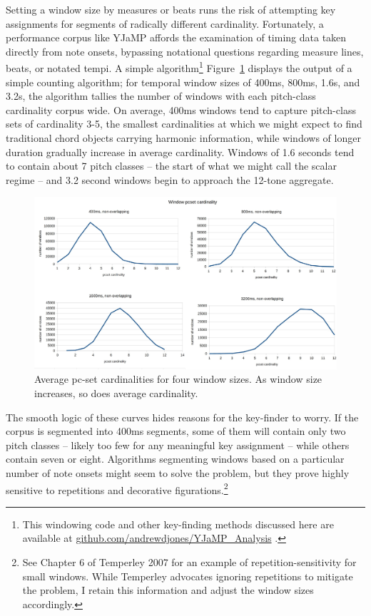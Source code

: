 Setting a window size by measures or beats runs the risk of attempting key assignments for segments of radically different cardinality.  Fortunately, a performance corpus like YJaMP affords the examination of timing data taken directly from note onsets, bypassing notational questions regarding measure lines, beats, or notated tempi.  A simple algorithm\footnote{This windowing code and other key-finding methods discussed here are available at \href{github.com/andrewdjones/YJaMP_Analysis}{github.com/andrewdjones/YJaMP\_Analysis} .}  Figure~\ref{cardinalities} displays the output of a simple counting algorithm; for temporal window sizes of 400ms, 800ms, 1.6s, and 3.2s, the algorithm tallies the number of windows with each pitch-class cardinality corpus wide.  On average, 400ms windows tend to capture pitch-class sets of cardinality 3-5, the smallest cardinalities at which we might expect to find traditional chord objects carrying harmonic information, while windows of longer duration gradually increase in average cardinality.  Windows of 1.6 seconds tend to contain about 7 pitch classes -- the start of what we might call the scalar regime -- and 3.2 second windows begin to approach the 12-tone aggregate.

\begin{landscape}
\begin{figure}
	\centering
	\includegraphics[width=8in]{cardinalities.jpg}
	\caption{Average pc-set cardinalities for four window sizes.  As window size increases, so does average cardinality.}
	\label{cardinalities}
\end{figure}
\end{landscape}

The smooth logic of these curves hides reasons for the key-finder to worry.  If the corpus is segmented into 400ms segments, some of them will contain only two pitch classes -- likely too few for any meaningful key assignment -- while others contain seven or eight.  Algorithms segmenting windows based on a particular number of note onsets might seem to solve the problem, but they prove highly sensitive to repetitions and decorative figurations.\footnote{See Chapter 6 of Temperley 2007 for an example of repetition-sensitivity for small windows.  While Temperley advocates ignoring repetitions to mitigate the problem, I retain this information and adjust the window sizes accordingly.}

